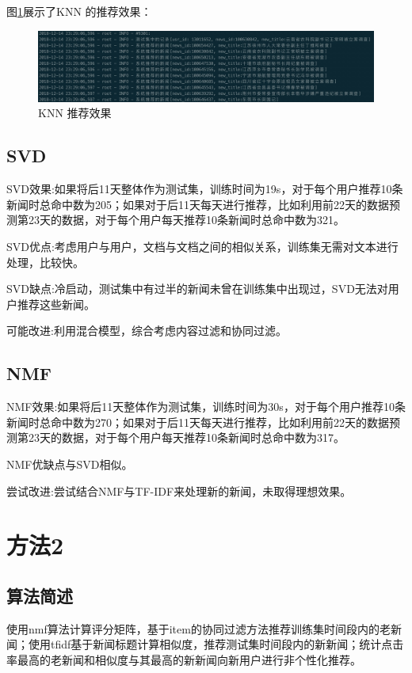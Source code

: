 \documentclass[UTF8]{article}
\begin{document}
图\ref{knn-example}展示了KNN 的推荐效果：
\begin{figure}[ht]
    \centering
    \includegraphics[scale=0.23]{./figures/knn-example.jpg}
    \caption{KNN 推荐效果}
    \label{knn-example}
\end{figure}

\subsection{SVD}
SVD效果:如果将后11天整体作为测试集，训练时间为19s，对于每个用户推荐10条新闻时总命中数为205；如果对于后11天每天进行推荐，比如利用前22天的数据预测第23天的数据，对于每个用户每天推荐10条新闻时总命中数为321。

SVD优点:考虑用户与用户，文档与文档之间的相似关系，训练集无需对文本进行处理，比较快。

SVD缺点:冷启动，测试集中有过半的新闻未曾在训练集中出现过，SVD无法对用户推荐这些新闻。

可能改进:利用混合模型，综合考虑内容过滤和协同过滤。
\subsection{NMF}
NMF效果:如果将后11天整体作为测试集，训练时间为30s，对于每个用户推荐10条新闻时总命中数为270；如果对于后11天每天进行推荐，比如利用前22天的数据预测第23天的数据，对于每个用户每天推荐10条新闻时总命中数为317。

NMF优缺点与SVD相似。

尝试改进:尝试结合NMF与TF-IDF来处理新的新闻，未取得理想效果。


\section{方法2}
\subsection{算法简述}
使用nmf算法计算评分矩阵，基于item的协同过滤方法推荐训练集时间段内的老新闻；使用tfidf基于新闻标题计算相似度，推荐测试集时间段内的新新闻；统计点击率最高的老新闻和相似度与其最高的新新闻向新用户进行非个性化推荐。
\end{document}
